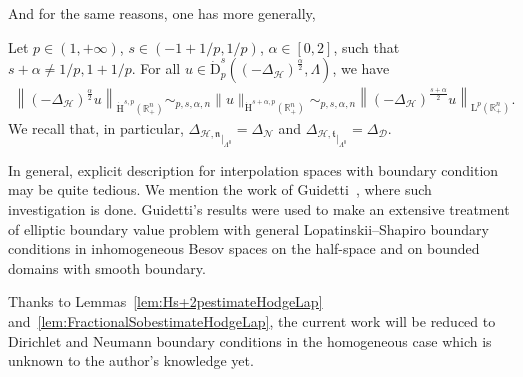 \documentclass[AHL,Unicode,longabstracts,published]{cedram}
\newcommand{\bbR}{\mathbb{R}}
\newcommand{\rmH}{\mathrm{H}}%
\newcommand{\rmD}{\mathrm{D}}
\newcommand{\rmL}{\mathrm{L}}
\newcommand{\clH}{\mathcal{H}}
\newcommand{\clN}{\mathcal{N}}
\newcommand{\clD}{\mathcal{D}}
\newcommand{\fkn}{\mathfrak{n}}
\newcommand{\fkt}{\mathfrak{t}}
\begin{document}
And for the same reasons, one has more generally,

\begin{lemm}\label{lem:FractionalSobestimateHodgeLap}
Let $p\in(1,+\infty)$, $s\in(-1+1/p,1/p)$, $\alpha\in[0,2]$, such that $s+\alpha\neq 1/p,1+1/p$. For all $u \in\dot{\rmD}^{s}_{p}((-{{\Delta}}_{\clH})^\frac{\alpha}{2},\Lambda)$, we have
\begin{align*}
\left\| (-{{\Delta}}_{\clH})^\frac{\alpha}{2} u \right\|_{\dot{\rmH}^{s,p}\left(\bbR^n_+\right)} \sim_{p,s,\alpha,n} \| u \|_{\dot{\rmH}^{s+\alpha,p}\left(\bbR^n_+\right)}\sim_{p,s,\alpha,n} \left\| (-{{\Delta}}_{\clH})^\frac{s+\alpha}{2} u \right\|_{\rmL^{p}\left(\bbR^n_+\right)}.
\end{align*}
We recall that, in particular, ${\Delta_{\clH,\fkn}}_{|_{\Lambda^0}}=\Delta_{\clN}$ and ${\Delta_{\clH,\fkt}}_{|_{\Lambda^0}}=\Delta_{\clD}$.
\end{lemm}

In general, explicit description for interpolation spaces with boundary condition may be quite tedious. We mention the work of Guidetti~\cite{Guidetti1991Ell,Guidetti1991Interp}, where such investigation is done. Guidetti's results were used to make an extensive treatment of elliptic boundary value problem with general Lopatinskii--Shapiro boundary conditions in inhomogeneous Besov spaces on the half-space and on bounded domains with smooth boundary.

Thanks to Lemmas~\ref{lem:Hs+2pestimateHodgeLap} and~\ref{lem:FractionalSobestimateHodgeLap}, the current work will be reduced to Dirichlet and Neumann boundary conditions in the homogeneous case which is unknown to the author's knowledge yet.
\end{document}
